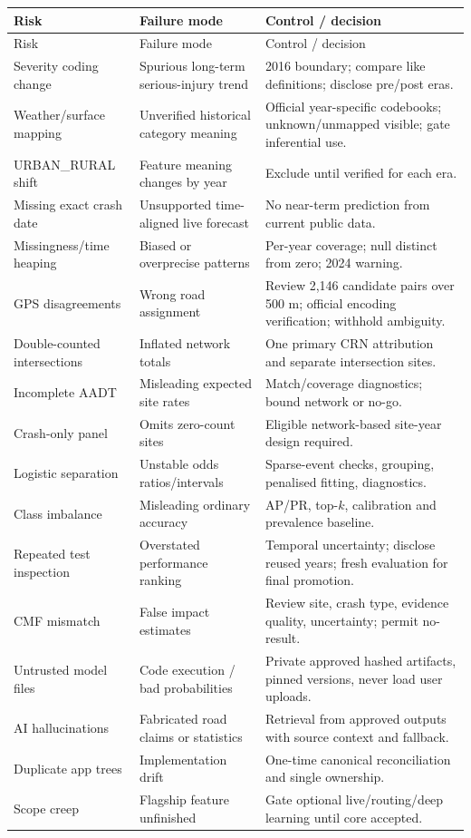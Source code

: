 \documentclass[11pt,a4paper,openany]{report}
\begin{document}
\begin{longtable}{@{}L{33mm}L{50mm}L{59mm}@{}}\toprule Risk & Failure mode & Control / decision\\\midrule\endfirsthead
\toprule Risk & Failure mode & Control / decision\\\midrule\endhead
Severity coding change & Spurious long-term serious-injury trend & 2016 boundary; compare like definitions; disclose pre/post eras.\\
Weather/surface mapping & Unverified historical category meaning & Official year-specific codebooks; unknown/unmapped visible; gate inferential use.\\
URBAN\_RURAL shift & Feature meaning changes by year & Exclude until verified for each era.\\
Missing exact crash date & Unsupported time-aligned live forecast & No near-term prediction from current public data.\\
Missingness/time heaping & Biased or overprecise patterns & Per-year coverage; null distinct from zero; 2024 warning.\\
GPS disagreements & Wrong road assignment & Review 2,146 candidate pairs over 500 m; official encoding verification; withhold ambiguity.\\
Double-counted intersections & Inflated network totals & One primary CRN attribution and separate intersection sites.\\
Incomplete AADT & Misleading expected site rates & Match/coverage diagnostics; bound network or no-go.\\
Crash-only panel & Omits zero-count sites & Eligible network-based site-year design required.\\
Logistic separation & Unstable odds ratios/intervals & Sparse-event checks, grouping, penalised fitting, diagnostics.\\
Class imbalance & Misleading ordinary accuracy & AP/PR, top-$k$, calibration and prevalence baseline.\\
Repeated test inspection & Overstated performance ranking & Temporal uncertainty; disclose reused years; fresh evaluation for final promotion.\\
CMF mismatch & False impact estimates & Review site, crash type, evidence quality, uncertainty; permit no-result.\\
Untrusted model files & Code execution / bad probabilities & Private approved hashed artifacts, pinned versions, never load user uploads.\\
AI hallucinations & Fabricated road claims or statistics & Retrieval from approved outputs with source context and fallback.\\
Duplicate app trees & Implementation drift & One-time canonical reconciliation and single ownership.\\
Scope creep & Flagship feature unfinished & Gate optional live/routing/deep learning until core accepted.\\
\bottomrule\end{longtable}
\normalsize
\end{document}
